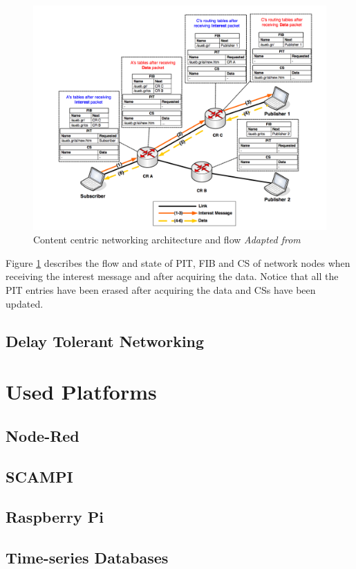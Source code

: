 \begin{figure}[H]
	\centering
	\includegraphics[scale=0.55]{images/ccn2.png}
	\caption{Content centric networking architecture and flow \textit{Adapted from \cite{6563278}}}
	\label{fig:ccn}
\end{figure}

Figure \ref{fig:ccn} describes the flow and state of PIT, FIB and CS of network nodes when receiving the interest message and after acquiring the data. Notice that all the PIT entries have been erased after acquiring the data and CSs have been updated.


\subsection{Delay Tolerant Networking}


\section{Used Platforms}
\subsection{Node-Red}
\subsection{SCAMPI}
\subsection{Raspberry Pi}
\subsection{Time-series Databases}


